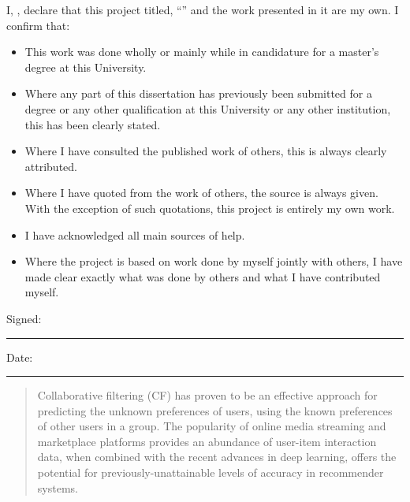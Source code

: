 \documentclass[
11pt,
oneside,
english,
singlespacing,
headsepline,
]{MastersDoctoralThesis}
\begin{document}

\begin{declaration}
\addchaptertocentry{\authorshipname} %
\noindent I, \authorname, declare that this project titled, \enquote{\ttitle} and the work presented in it are my own. I confirm that:

\begin{itemize} 
\item This work was done wholly or mainly while in candidature for a master's degree at this University.
\item Where any part of this dissertation has previously been submitted for a degree or any other qualification at this University or any other institution, this has been clearly stated.
\item Where I have consulted the published work of others, this is always clearly attributed.
\item Where I have quoted from the work of others, the source is always given. With the exception of such quotations, this project is entirely my own work.
\item I have acknowledged all main sources of help.
\item Where the project is based on work done by myself jointly with others, I have made clear exactly what was done by others and what I have contributed myself.
\end{itemize}
\vspace{5em}
\noindent Signed:\\
\rule[0.5em]{25em}{0.5pt} %
 
\noindent Date:\\
\rule[0.5em]{25em}{0.5pt} %
\end{declaration}

\cleardoublepage

% 


\begin{abstract}
\addchaptertocentry{\abstractname} %
Collaborative filtering (CF) has proven to be an effective approach for predicting the unknown preferences of users, using the known preferences of other users in a group. The popularity of online media streaming and marketplace platforms provides an abundance of user-item interaction data, when combined with the recent advances in deep learning, offers the potential for previously-unattainable levels of accuracy in recommender systems.
\end{abstract}
\end{document}
